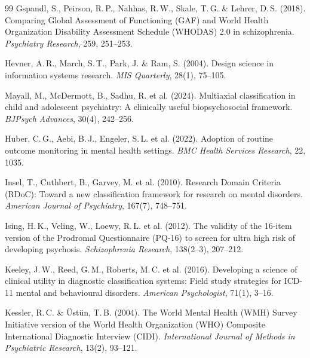 \documentclass[11pt,a4paper]{article}
\begin{document}
\begin{thebibliography}{99}
Gspandl, S., Peirson, R.\,P., Nahhas, R.\,W., Skale, T.\,G. \& Lehrer, D.\,S. (2018).
\newblock Comparing Global Assessment of Functioning (GAF) and World Health Organization Disability Assessment Schedule (WHODAS) 2.0 in schizophrenia.
\newblock \textit{Psychiatry Research}, 259, 251--253.

Hevner, A.\,R., March, S.\,T., Park, J. \& Ram, S. (2004).
\newblock Design science in information systems research.
\newblock \textit{MIS Quarterly}, 28(1), 75--105.

Mayall, M., McDermott, B., Sadhu, R. et al. (2024).
\newblock Multiaxial classification in child and adolescent psychiatry: A clinically useful biopsychosocial framework.
\newblock \textit{BJPsych Advances}, 30(4), 242--256.

Huber, C.\,G., Aebi, B.\,J., Engeler, S.\,L. et al. (2022).
\newblock Adoption of routine outcome monitoring in mental health settings.
\newblock \textit{BMC Health Services Research}, 22, 1035.

Insel, T., Cuthbert, B., Garvey, M. et al. (2010).
\newblock Research Domain Criteria (RDoC): Toward a new classification framework for research on mental disorders.
\newblock \textit{American Journal of Psychiatry}, 167(7), 748--751.

Ising, H.\,K., Veling, W., Loewy, R.\,L. et al. (2012).
\newblock The validity of the 16-item version of the Prodromal Questionnaire (PQ-16) to screen for ultra high risk of developing psychosis.
\newblock \textit{Schizophrenia Research}, 138(2--3), 207--212.

Keeley, J.\,W., Reed, G.\,M., Roberts, M.\,C. et al. (2016).
\newblock Developing a science of clinical utility in diagnostic classification systems: Field study strategies for ICD-11 mental and behavioural disorders.
\newblock \textit{American Psychologist}, 71(1), 3--16.

Kessler, R.\,C. \& \"{U}st\"{u}n, T.\,B. (2004).
\newblock The World Mental Health (WMH) Survey Initiative version of the World Health Organization (WHO) Composite International Diagnostic Interview (CIDI).
\newblock \textit{International Journal of Methods in Psychiatric Research}, 13(2), 93--121.


\end{thebibliography}
\end{document}
